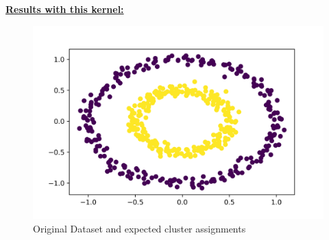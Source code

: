 \documentclass[11pt]{article}
\begin{document}
\underline{\textbf{Results with this kernel: }}

\begin{figure}[H]
    \centering
    \includegraphics[width=0.55\linewidth]{kkm.png}
    \caption{Original Dataset and expected cluster assignments}
\end{figure}%
\vspace*{-0.7cm}
\end{document}
